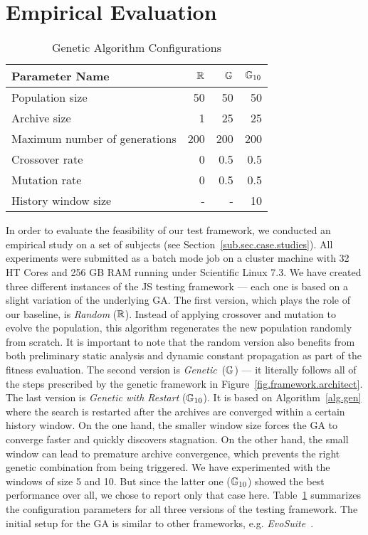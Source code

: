 \section{Empirical Evaluation}
\label{sec.evaluation}

\begin{table}[!t]
  \caption{Genetic Algorithm Configurations}
  \label{tbl.gen.config}
  \scriptsize
  \centering
  \begin{tabular}{l|r|r|r}
    \toprule
    \textbf{Parameter Name} &$\mathbb{R}$&$\mathbb{G}$ &$\mathbb{G}_{10}$ \\
    \hline
    Population size                   & 50  & 50  & 50  \\
    Archive size                      & 1   & 25  & 25  \\
    Maximum number of generations     & 200 & 200 & 200 \\
    Crossover rate                    & 0   & 0.5 & 0.5 \\
    Mutation rate                     & 0   & 0.5 & 0.5 \\
    History window size               & -   & -   & 10  \\
    \bottomrule
  \end{tabular}
\end{table}

In order to evaluate the feasibility of our test framework, we conducted an empirical study on a set of subjects (see Section~\ref{sub.sec.case.studies}). All experiments were submitted as a batch mode job on a cluster machine with 32 HT Cores and 256 GB RAM running under Scientific Linux 7.3. We have created three different instances of the JS testing framework --- each one is based on a slight variation of the underlying GA. The first version, which plays the role of our baseline, is \emph{Random} ($\mathbb{R}$). Instead of applying crossover and mutation to evolve the population, this algorithm regenerates the new population randomly from scratch. It is important to note  that the random version also benefits from both preliminary static analysis and dynamic constant propagation as part of the fitness evaluation. The second version is \emph{Genetic}~($\mathbb{G}$) --- it literally follows all of the steps prescribed by the genetic framework in Figure~\ref{fig.framework.architect}. The last version is \emph{Genetic with Restart} ($\mathbb{G}_{10}$). It is based on Algorithm~\ref{alg.gen} where the search is restarted after the archives are converged within a certain history window. On the one hand, the smaller window size forces the GA to converge faster and quickly discovers stagnation. On the other hand, the small window can lead to premature archive convergence, which prevents the right genetic combination from being triggered. We have experimented with the windows of size 5 and 10. But since the latter one ($\mathbb{G}_{10}$) showed the best performance over all, we chose to report only that case here. Table~\ref{tbl.gen.config} summarizes the configuration parameters for all three versions of the testing framework. The initial setup for the GA is similar to other frameworks, e.g. \emph{EvoSuite}~\cite{fraser2011evosuite}.

